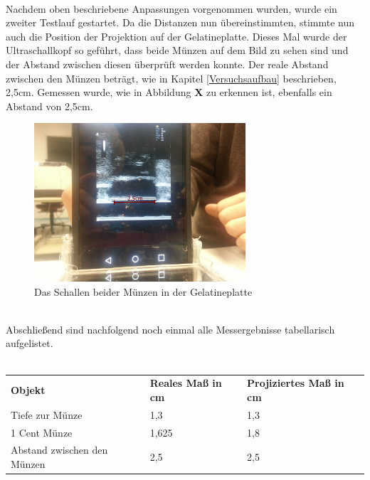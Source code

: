 ~\\
Nachdem oben beschriebene Anpassungen vorgenommen wurden, wurde ein zweiter Testlauf gestartet. Da die Distanzen nun übereinstimmten, stimmte nun auch die Position der Projektion auf der Gelatineplatte. Dieses Mal wurde der Ultraschallkopf so geführt, dass beide Münzen auf dem Bild zu sehen sind und der Abstand zwischen diesen überprüft werden konnte. Der reale Abstand zwischen den Münzen beträgt, wie in Kapitel \ref{Versuchsaufbau} beschrieben, 2,5cm. Gemessen wurde, wie in Abbildung \textbf{X} zu erkennen ist, ebenfalls ein Abstand von 2,5cm.
\clearpage
\begin{figure}[h]
	\centering
	\includegraphics[width=0.7\textwidth]{Bilder/Evaluation/2Muenzen.jpg}
	\caption{Das Schallen beider Münzen in der Gelatineplatte}
	\label{fig:2Muenzen}
\end{figure}

~\\
Abschließend sind nachfolgend noch einmal alle Messergebnisse tabellarisch aufgelistet.
\\
\\
\begin{tabular}{lll}
\textbf{Objekt} & \textbf{Reales Maß in cm} & \textbf{Projiziertes Maß in cm}\\
Tiefe zur Münze & 1,3 & 1,3\\
1 Cent Münze & 1,625 & 1,8\\
Abstand zwischen den Münzen & 2,5 & 2,5\\
\end{tabular}

